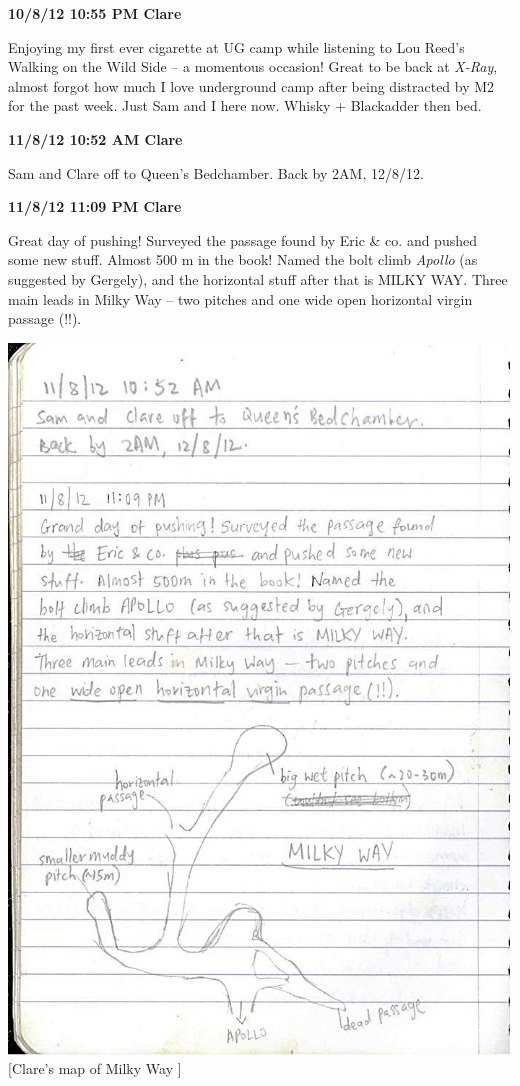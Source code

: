 \textbf{10/8/12 10:55 PM Clare}

Enjoying my first ever cigarette at UG camp while listening to Lou
Reed's Walking on the Wild Side -- a momentous occasion! Great to be
back at \emph{X-Ray}, almost forgot how much I love underground camp
after being distracted by M2 for the past week. Just Sam and I here now.
Whisky + Blackadder then bed.

\textbf{11/8/12 10:52 AM Clare}

Sam and Clare off to Queen's Bedchamber. Back by 2AM, 12/8/12.

\textbf{11/8/12 11:09 PM Clare}

Great day of pushing! Surveyed the passage found by Eric \& co. and
pushed some new stuff. Almost 500 m in the book! Named the bolt climb
\emph{Apollo} (as suggested by Gergely), and the horizontal stuff after
that is MILKY WAY. Three main leads in Milky Way -- two pitches and one
wide open horizontal virgin passage (!!).

\includegraphics{UgLog1012/89.jpeg}\\
{[}Clare's map of Milky Way {]}

